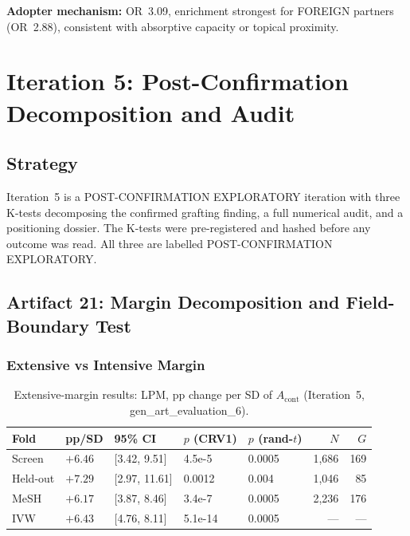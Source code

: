 \documentclass[11pt,letterpaper]{article}
\begin{document}
\textbf{Adopter mechanism:} OR~3.09, enrichment strongest for FOREIGN partners (OR~2.88), consistent with absorptive capacity or topical proximity.


\section{Iteration 5: Post-Confirmation Decomposition and Audit}
\label{sec:iter5}

\subsection{Strategy}

Iteration~5 is a POST-CONFIRMATION EXPLORATORY iteration with three K-tests decomposing the confirmed grafting finding, a full numerical audit, and a positioning dossier.
The K-tests were pre-registered and hashed before any outcome was read.
All three are labelled POST-CONFIRMATION EXPLORATORY.

\subsection{Artifact 21: Margin Decomposition and Field-Boundary Test}

\subsubsection{Extensive vs Intensive Margin}

\begin{table}[!htbp]
\centering
\caption{Extensive-margin results: LPM, pp change per SD of $A_{\mathrm{cont}}$ (Iteration~5, gen\_art\_evaluation\_6).}
\label{tab:extensive}
\begin{tabular}{lR{1.2cm}L{2.5cm}R{1.3cm}R{1.3cm}rr}
\toprule
Fold & pp/SD & 95\% CI & $p$ (CRV1) & $p$ (rand-$t$) & $N$ & $G$ \\
\midrule
Screen & $+6.46$ & [3.42, 9.51] & 4.5e-5 & 0.0005 & 1,686 & 169 \\
Held-out & $+7.29$ & [2.97, 11.61] & 0.0012 & 0.004 & 1,046 & 85 \\
MeSH & $+6.17$ & [3.87, 8.46] & 3.4e-7 & 0.0005 & 2,236 & 176 \\
IVW & $+6.43$ & [4.76, 8.11] & 5.1e-14 & 0.0005 & --- & --- \\
\bottomrule
\end{tabular}
\end{table}
\end{document}
